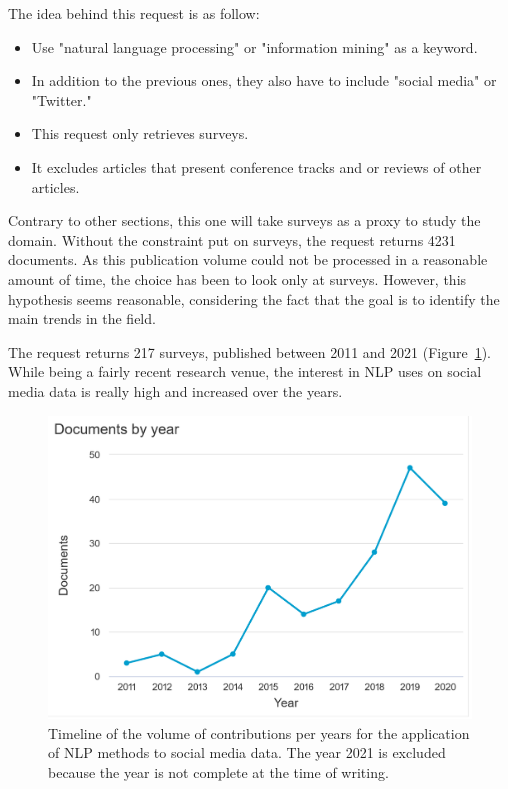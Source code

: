 The idea behind this request is as follow:

\begin{itemize}
    \item Use "natural language processing" or "information mining" as a keyword.
    \item In addition to the previous ones, they also have to include "social media" or "Twitter."
    \item This request only retrieves surveys.
    \item It excludes articles that present conference tracks and or reviews of other articles.
\end{itemize}

Contrary to other sections, this one will take surveys as a proxy to study the domain.
Without the constraint put on surveys, the request returns 4231 documents.
As this publication volume could not be processed in a reasonable amount of time, the choice has been to look only at surveys.
However, this hypothesis seems reasonable, considering the fact that the goal is to identify the main trends in the field.

The request returns 217 surveys, published between 2011 and 2021 (Figure~\ref{literature:nlp-hist}).
While being a fairly recent research venue, the interest in NLP uses on social media data is really high and increased over the years.

\begin{figure}[htb]
    \centering
    \includegraphics[width=\textwidth]{figures/chap-2/nlp-hist.pdf}
    \caption{Timeline of the volume of contributions per years for the application of NLP methods to social media data. The year 2021 is excluded because the year is not complete at the time of writing.}
    \label{literature:nlp-hist}
\end{figure}

